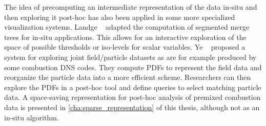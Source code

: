%
The idea of precomputing an intermediate representation of the data in-situ and
then exploring it post-hoc has also been applied in some more specialized
visualization systems.
%
Landge \etal~\cite{Landge2014} adapted the computation of segmented merge trees
\cite{Bremer2009,Bremer2011} for in-situ applications.
%
This allows for an interactive exploration of the space of possible thresholds
or iso-levels for scalar variables.
%
Ye \etal~\cite{Ye2016} proposed a system for exploring joint field/particle
datasets as are for example produced by some combustion \ac{DNS} codes.
%
They compute \acp{PDF} to represent the field data and reorganize the particle
data into a more efficient scheme.
%
Researchers can then explore the \acp{PDF} in a post-hoc tool and define queries
to select matching particle data.
%
A space-saving representation for post-hoc analysis of premixed combustion data
is presented in \cref{cha:sparse_representation} of this thesis, although not as
an in-situ algorithm.
%
%
%
%
%
